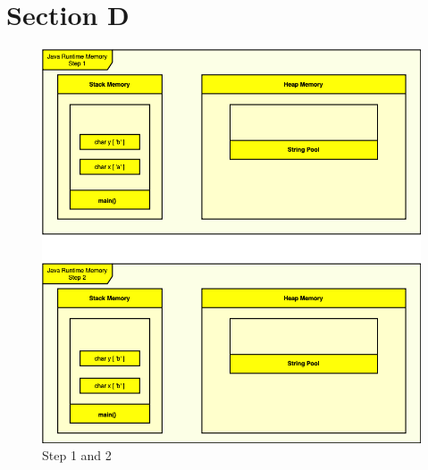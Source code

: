 \documentclass{assignment}
\begin{document}
\section*{Section D}
\begin{figure}[h]
    \centering
    \includegraphics[scale=0.6]{assets/homework2diagram(1-2).png}
    \caption{Step 1 and 2}
\end{figure}
\end{document}
